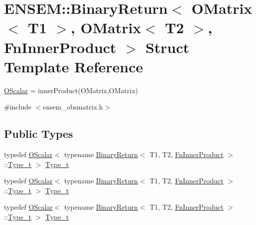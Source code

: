 \hypertarget{structENSEM_1_1BinaryReturn_3_01OMatrix_3_01T1_01_4_00_01OMatrix_3_01T2_01_4_00_01FnInnerProduct_01_4}{}\section{E\+N\+S\+EM\+:\+:Binary\+Return$<$ O\+Matrix$<$ T1 $>$, O\+Matrix$<$ T2 $>$, Fn\+Inner\+Product $>$ Struct Template Reference}
\label{structENSEM_1_1BinaryReturn_3_01OMatrix_3_01T1_01_4_00_01OMatrix_3_01T2_01_4_00_01FnInnerProduct_01_4}


\mbox{\hyperlink{classENSEM_1_1OScalar}{O\+Scalar}} = inner\+Product(\+O\+Matrix,\+O\+Matrix)  




{\ttfamily \#include $<$ensem\+\_\+obsmatrix.\+h$>$}

\subsection*{Public Types}
\begin{DoxyCompactItemize}
\item 
typedef \mbox{\hyperlink{classENSEM_1_1OScalar}{O\+Scalar}}$<$ typename \mbox{\hyperlink{structENSEM_1_1BinaryReturn}{Binary\+Return}}$<$ T1, T2, \mbox{\hyperlink{structENSEM_1_1FnInnerProduct}{Fn\+Inner\+Product}} $>$\+::\mbox{\hyperlink{structENSEM_1_1BinaryReturn_3_01OMatrix_3_01T1_01_4_00_01OMatrix_3_01T2_01_4_00_01FnInnerProduct_01_4_a28a5e6d9f636db51eb542a0a4602c034}{Type\+\_\+t}} $>$ \mbox{\hyperlink{structENSEM_1_1BinaryReturn_3_01OMatrix_3_01T1_01_4_00_01OMatrix_3_01T2_01_4_00_01FnInnerProduct_01_4_a28a5e6d9f636db51eb542a0a4602c034}{Type\+\_\+t}}
\item 
typedef \mbox{\hyperlink{classENSEM_1_1OScalar}{O\+Scalar}}$<$ typename \mbox{\hyperlink{structENSEM_1_1BinaryReturn}{Binary\+Return}}$<$ T1, T2, \mbox{\hyperlink{structENSEM_1_1FnInnerProduct}{Fn\+Inner\+Product}} $>$\+::\mbox{\hyperlink{structENSEM_1_1BinaryReturn_3_01OMatrix_3_01T1_01_4_00_01OMatrix_3_01T2_01_4_00_01FnInnerProduct_01_4_a28a5e6d9f636db51eb542a0a4602c034}{Type\+\_\+t}} $>$ \mbox{\hyperlink{structENSEM_1_1BinaryReturn_3_01OMatrix_3_01T1_01_4_00_01OMatrix_3_01T2_01_4_00_01FnInnerProduct_01_4_a28a5e6d9f636db51eb542a0a4602c034}{Type\+\_\+t}}
\item 
typedef \mbox{\hyperlink{classENSEM_1_1OScalar}{O\+Scalar}}$<$ typename \mbox{\hyperlink{structENSEM_1_1BinaryReturn}{Binary\+Return}}$<$ T1, T2, \mbox{\hyperlink{structENSEM_1_1FnInnerProduct}{Fn\+Inner\+Product}} $>$\+::\mbox{\hyperlink{structENSEM_1_1BinaryReturn_3_01OMatrix_3_01T1_01_4_00_01OMatrix_3_01T2_01_4_00_01FnInnerProduct_01_4_a28a5e6d9f636db51eb542a0a4602c034}{Type\+\_\+t}} $>$ \mbox{\hyperlink{structENSEM_1_1BinaryReturn_3_01OMatrix_3_01T1_01_4_00_01OMatrix_3_01T2_01_4_00_01FnInnerProduct_01_4_a28a5e6d9f636db51eb542a0a4602c034}{Type\+\_\+t}}
\end{DoxyCompactItemize}


